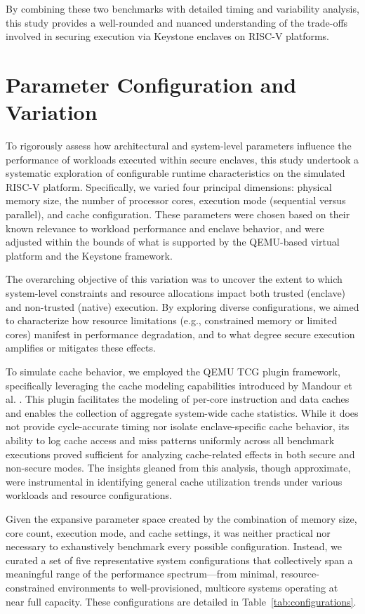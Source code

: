 By combining these two benchmarks with detailed timing and variability analysis, this study provides a well-rounded and nuanced understanding of the trade-offs involved in securing execution via Keystone enclaves on RISC-V platforms.

\section{Parameter Configuration and Variation}
\label{sec:param-variation}

To rigorously assess how architectural and system-level parameters influence the performance of workloads executed within secure enclaves, this study undertook a systematic exploration of configurable runtime characteristics on the simulated RISC-V platform. Specifically, we varied four principal dimensions: physical memory size, the number of processor cores, execution mode (sequential versus parallel), and cache configuration. These parameters were chosen based on their known relevance to workload performance and enclave behavior, and were adjusted within the bounds of what is supported by the QEMU-based virtual platform and the Keystone framework.

The overarching objective of this variation was to uncover the extent to which system-level constraints and resource allocations impact both trusted (enclave) and non-trusted (native) execution. By exploring diverse configurations, we aimed to characterize how resource limitations (e.g., constrained memory or limited cores) manifest in performance degradation, and to what degree secure execution amplifies or mitigates these effects.

To simulate cache behavior, we employed the QEMU TCG plugin framework, specifically leveraging the cache modeling capabilities introduced by Mandour et al. \cite{mandour2021cache}. This plugin facilitates the modeling of per-core instruction and data caches and enables the collection of aggregate system-wide cache statistics. While it does not provide cycle-accurate timing nor isolate enclave-specific cache behavior, its ability to log cache access and miss patterns uniformly across all benchmark executions proved sufficient for analyzing cache-related effects in both secure and non-secure modes. The insights gleaned from this analysis, though approximate, were instrumental in identifying general cache utilization trends under various workloads and resource configurations.

Given the expansive parameter space created by the combination of memory size, core count, execution mode, and cache settings, it was neither practical nor necessary to exhaustively benchmark every possible configuration. Instead, we curated a set of five representative system configurations that collectively span a meaningful range of the performance spectrum—from minimal, resource-constrained environments to well-provisioned, multicore systems operating at near full capacity. These configurations are detailed in Table~\ref{tab:configurations}.

